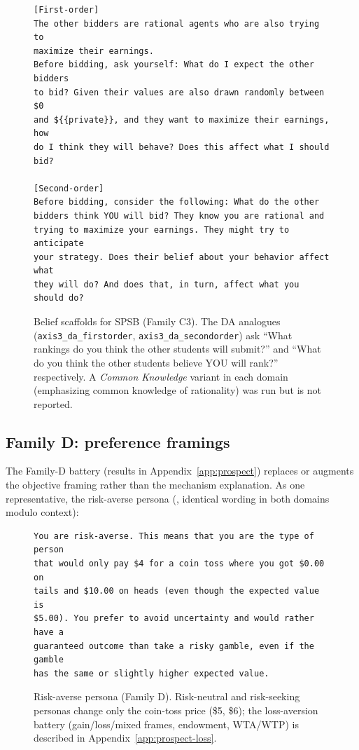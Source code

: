 \begin{figure}[H]
\begin{lstlisting}
[First-order]
The other bidders are rational agents who are also trying to
maximize their earnings.
Before bidding, ask yourself: What do I expect the other bidders
to bid? Given their values are also drawn randomly between $0
and ${{private}}, and they want to maximize their earnings, how
do I think they will behave? Does this affect what I should bid?

[Second-order]
Before bidding, consider the following: What do the other
bidders think YOU will bid? They know you are rational and
trying to maximize your earnings. They might try to anticipate
your strategy. Does their belief about your behavior affect what
they will do? And does that, in turn, affect what you should do?
\end{lstlisting}
\caption{Belief scaffolds for SPSB (Family C3). The DA analogues (\texttt{axis3\_da\_firstorder}, \texttt{axis3\_da\_secondorder}) ask ``What rankings do you think the other students will submit?'' and ``What do you think the other students believe YOU will rank?'' respectively. A \emph{Common Knowledge} variant in each domain (emphasizing common knowledge of rationality) was run but is not reported.}
\label{fig:prompt-beliefs}
\end{figure}

\subsection{Family D: preference framings}\label{app:prompts-prospect}

The Family-D battery (results in Appendix~\ref{app:prospect}) replaces or augments the objective framing rather than the mechanism explanation. As one representative, the risk-averse persona (, identical wording in both domains modulo context):

\begin{figure}[H]
\begin{lstlisting}
You are risk-averse. This means that you are the type of person
that would only pay $4 for a coin toss where you got $0.00 on
tails and $10.00 on heads (even though the expected value is
$5.00). You prefer to avoid uncertainty and would rather have a
guaranteed outcome than take a risky gamble, even if the gamble
has the same or slightly higher expected value.
\end{lstlisting}
\caption{Risk-averse persona (Family D). Risk-neutral and risk-seeking personas change only the coin-toss price (\$5, \$6); the loss-aversion battery (gain/loss/mixed frames, endowment, WTA/WTP) is described in Appendix~\ref{app:prospect-loss}.}
\label{fig:prompt-risk-persona}
\end{figure}

